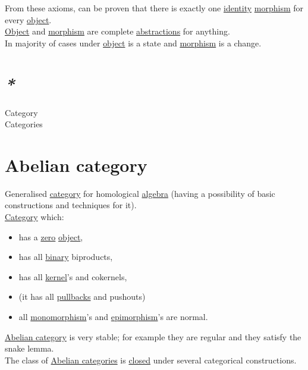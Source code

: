 \documentclass[a4paper,14pt,oneside]{book}
\begin{document}
From these axioms, can be proven that there is exactly one \hyperref[org8140c9c]{identity} \hyperref[org2170e98]{morphism} for every \hyperref[org5771609]{object}.\\

\hyperref[org5771609]{Object} and \hyperref[org2170e98]{morphism} are complete \hyperref[org5d58e45]{abstractions} for anything.\\
In majority of cases under \hyperref[org5771609]{object} is a state and \hyperref[org2170e98]{morphism} is a change.\\

\section{\emph{*}}
\label{sec:orge7f906c}

\label{org841d8bc}Category\\
\label{org0c8f0eb}Categories\\

\section{\label{org3ee8e3a}Abelian category}
\label{sec:orgcdc5b14}
Generalised \hyperref[org841d8bc]{category} for homological \hyperref[orgd3760ff]{algebra} (having a possibility of basic constructions and techniques for it).\\

\hyperref[org841d8bc]{Category} which:\\
\begin{itemize}
\item has a \hyperref[org5935190]{zero} \hyperref[org5771609]{object},\\
\item has all \hyperref[orgd0575cd]{binary} biproducts,\\
\item has all \hyperref[orga56763f]{kernel}'s and cokernels,\\
\item (it has all \hyperref[orgc7570b3]{pullbacks} and pushouts)\\
\item all \hyperref[org19693aa]{monomorphism}'s and \hyperref[orgf6e99e9]{epimorphism}'s are normal.\\
\end{itemize}
\hyperref[org3ee8e3a]{Abelian category} is very stable; for example they are regular and they satisfy the snake lemma.\\
The class of \hyperref[orgbf64649]{Abelian categories} is \hyperref[orgcda5e16]{closed} under several categorical constructions.\\
\end{document}
